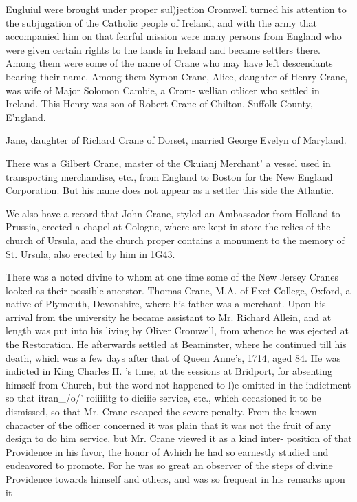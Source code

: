\documentclass[oneside]{book}
\begin{document}
Eugluiul were brought under proper sul)jection Cromwell turned 
his attention to the subjugation of the Catholic people of Ireland, 
and with the army that accompanied him on that fearful mission 
were many persons from England who were given certain rights 
to the lands in Ireland and became settlers there. Among them 
were some of the name of Crane who may have left descendants 
bearing their name. Among them Symon Crane, Alice, daughter 
of Henry Crane, was wife of Major Solomon Cambie, a Crom- 
wellian otlicer who settled in Ireland. This Henry was son of 
Robert Crane of Chilton, Suffolk County, E'ngland. 

Jane, daughter of Richard Crane of Dorset, married George 
Evelyn of Maryland. 

There was a Gilbert Crane, master of the Ckuianj Merchant' 
a vessel used in transporting merchandise, etc., from England to 
Boston for the New England Corporation. But his name does 
not appear as a settler this side the Atlantic. 

We also have a record that John Crane, styled an Ambassador 
from Holland to Prussia, erected a chapel at Cologne, where are 
kept in store the relics of the church of Ursula, and the church 
proper contains a monument to the memory of St. Ursula, also 
erected by him in 1G43. 

There was a noted divine to whom at one time some of the 
New Jersey Cranes looked as their possible ancestor. Thomas 
Crane, M.A. of Exet College, Oxford, a native of Plymouth, 
Devonshire, where his father was a merchant. Upon his arrival 
from the university he became assistant to Mr. Richard Allein, 
and at length was put into his living by Oliver Cromwell, from 
whence he was ejected at the Restoration. He afterwards settled 
at Beaminster, where he continued till his death, which was a few 
days after that of Queen Anne's, 1714, aged 84. He was 
indicted in King Charles II. 's time, at the sessions at Bridport, 
for absenting himself from Church, but the word not happened to 
l)e omitted in the indictment so that itran\_/o/' roiiiiitg to diciiie 
service, etc., which occasioned it to be dismissed, so that Mr. 
Crane escaped the severe penalty. From the known character of 
the officer concerned it was plain that it was not the fruit of any 
design to do him service, but Mr. Crane viewed it as a kind inter- 
position of that Providence in his favor, the honor of Avhich he 
had so earnestly studied and eudeavored to promote. For he 
was so great an observer of the steps of divine Providence towards 
himself and others, and was so frequent in his remarks upon it 
\end{document}
